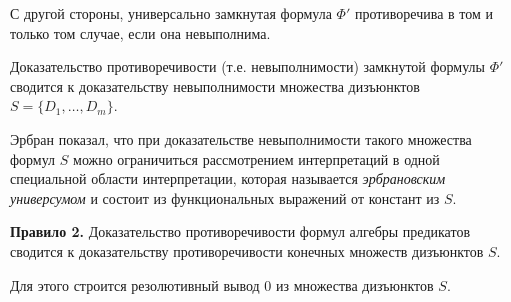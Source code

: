 С другой стороны, универсально замкнутая формула $\Phi'$ противоречива в том и только том случае, если она невыполнима.

Доказательство противоречивости (т.е. невыполнимости) замкнутой формулы $\Phi'$ сводится к доказательству невыполнимости множества дизъюнктов 
$S=\{D_1,\ldots,D_m\}$.

Эрбран показал, что при доказательстве невыполнимости такого множества формул $S$ можно ограничиться рассмотрением интерпретаций в одной специальной области интерпретации, которая называется \textit{эрбрановским универсумом} и состоит из функциональных выражений от констант из $S$.

\textbf{Правило 2.} Доказательство противоречивости формул алгебры предикатов сводится к доказательству противоречивости конечных множеств дизъюнктов $S$.

Для этого строится резолютивный вывод 0 из множества дизъюнктов $S$.